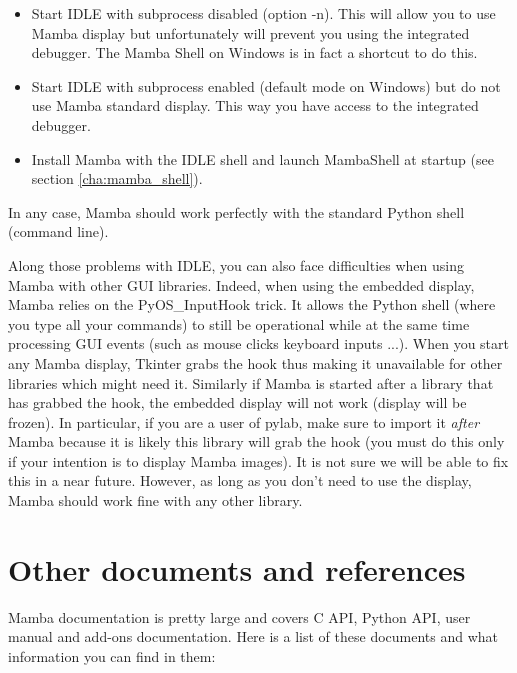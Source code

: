 \documentclass[a4paper,10pt,oneside]{article}
\begin{document}
\begin{itemize}
\item Start IDLE with subprocess disabled (option -n). This will allow you to 
use Mamba display but unfortunately will prevent you using the integrated
debugger. The Mamba Shell on Windows is in fact a shortcut to do this.
\item Start IDLE with subprocess enabled (default mode on Windows) but do not
use Mamba standard display. This way you have access to the integrated debugger.
\item Install Mamba with the IDLE shell and launch MambaShell at startup (see
section \ref{cha:mamba_shell}).
\end{itemize}

In any case, Mamba should work perfectly with the standard Python shell 
(command line).

Along those problems with IDLE, you can also face difficulties when using
Mamba with other GUI libraries. Indeed, when using the embedded display,
Mamba relies on the PyOS\_InputHook trick. It allows the Python shell (where 
you type all your commands) to still be operational while at the same time
processing GUI events (such as mouse clicks keyboard inputs ...). When you
start any Mamba display, Tkinter grabs the hook thus making it unavailable
for other libraries which might need it. Similarly if Mamba is started
after a library that has grabbed the hook, the embedded display will not
work (display will be frozen). In particular, if you are a user of pylab,
make sure to import it \textit{after} Mamba because it is likely
this library will grab the hook (you must do this only if your intention is to
display Mamba images). It is not sure we will be able to fix this in a near
future. However, as long as you don't need to use the display, Mamba should 
work fine with any other library.

\pagebreak

\section{Other documents and references}
\label{cha:other_docs}

Mamba documentation is pretty large and covers C API, Python API, user manual 
and add-ons documentation. Here is a list of these documents and what 
information you can find in them:
\end{document}
